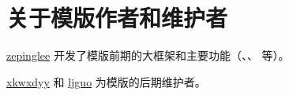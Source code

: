 
\section{关于模版作者和维护者}

\href{https://github.com/zepinglee}{zepinglee} 开发了模版前期的大框架和主要功能（、、 等）。

\href{https://github.com/xkwxdyy}{xkwxdyy} 和 \href{https://github.com/ljguo1020}{ljguo} 为模版的后期维护者。
